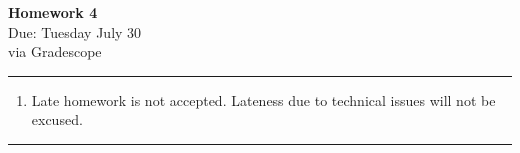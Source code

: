 \documentclass[12pt]{article}
\newif\ifshow
\begin{document}
\begin{center}
\ifshow
  \textbf{\Large Homework 4 Solution}\\
\else
  \textbf{\Large Homework 4}\\
\fi
Due: Tuesday July 30\\via Gradescope\\
\end{center}

\hrule

\vspace{0.2cm}

\begin{enumerate}[$\bullet$]  
\item Late homework is not accepted.  Lateness due to technical issues will not be excused.  
\end{enumerate}

\hrule

\vspace{0.5cm}
\end{document}
